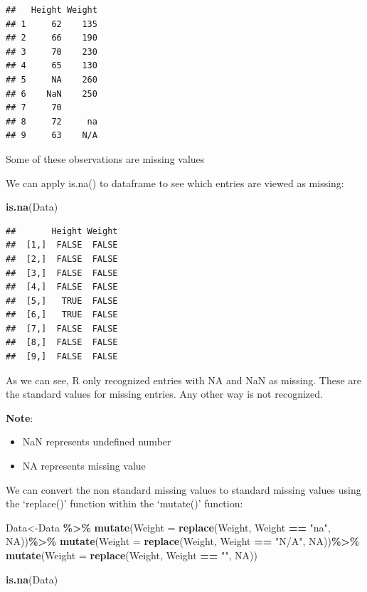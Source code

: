 \documentclass[
  openany]{book}
\newenvironment{Shaded}{\begin{snugshade}}{\end{snugshade}}
\newcommand{\AttributeTok}[1]{\textcolor[rgb]{0.13,0.29,0.53}{#1}}
\newcommand{\ConstantTok}[1]{\textcolor[rgb]{0.56,0.35,0.01}{#1}}
\newcommand{\FunctionTok}[1]{\textcolor[rgb]{0.13,0.29,0.53}{\textbf{#1}}}
\newcommand{\NormalTok}[1]{#1}
\newcommand{\OtherTok}[1]{\textcolor[rgb]{0.56,0.35,0.01}{#1}}
\newcommand{\SpecialCharTok}[1]{\textcolor[rgb]{0.81,0.36,0.00}{\textbf{#1}}}
\newcommand{\StringTok}[1]{\textcolor[rgb]{0.31,0.60,0.02}{#1}}
\providecommand{\tightlist}{%
  \setlength{\itemsep}{0pt}\setlength{\parskip}{0pt}}
\begin{document}
\begin{verbatim}
##   Height Weight
## 1     62    135
## 2     66    190
## 3     70    230
## 4     65    130
## 5     NA    260
## 6    NaN    250
## 7     70       
## 8     72     na
## 9     63    N/A
\end{verbatim}

Some of these observations are missing values

We can apply is.na() to dataframe to see which entries are viewed as missing:

\begin{Shaded}
\begin{Highlighting}[]
\FunctionTok{is.na}\NormalTok{(Data)}
\end{Highlighting}
\end{Shaded}

\begin{verbatim}
##       Height Weight
##  [1,]  FALSE  FALSE
##  [2,]  FALSE  FALSE
##  [3,]  FALSE  FALSE
##  [4,]  FALSE  FALSE
##  [5,]   TRUE  FALSE
##  [6,]   TRUE  FALSE
##  [7,]  FALSE  FALSE
##  [8,]  FALSE  FALSE
##  [9,]  FALSE  FALSE
\end{verbatim}

As we can see, R only recognized entries with NA and NaN as missing. These are the standard values for missing entries. Any other way is not recognized.

\textbf{Note}:

\begin{itemize}
\tightlist
\item
  NaN represents undefined number
\item
  NA represents missing value
\end{itemize}

We can convert the non standard missing values to \textquotesingle standard missing values\textquotesingle{} using the `replace()' function within the `mutate()' function:

\begin{Shaded}
\begin{Highlighting}[]
\NormalTok{Data}\OtherTok{\textless{}{-}}\NormalTok{Data }\SpecialCharTok{\%\textgreater{}\%} 
  \FunctionTok{mutate}\NormalTok{(}\AttributeTok{Weight =} \FunctionTok{replace}\NormalTok{(Weight, Weight }\SpecialCharTok{==} \StringTok{"na"}\NormalTok{, }\ConstantTok{NA}\NormalTok{))}\SpecialCharTok{\%\textgreater{}\%}
  \FunctionTok{mutate}\NormalTok{(}\AttributeTok{Weight =} \FunctionTok{replace}\NormalTok{(Weight, Weight }\SpecialCharTok{==} \StringTok{"N/A"}\NormalTok{, }\ConstantTok{NA}\NormalTok{))}\SpecialCharTok{\%\textgreater{}\%}
  \FunctionTok{mutate}\NormalTok{(}\AttributeTok{Weight =} \FunctionTok{replace}\NormalTok{(Weight, Weight }\SpecialCharTok{==} \StringTok{""}\NormalTok{, }\ConstantTok{NA}\NormalTok{))}

\FunctionTok{is.na}\NormalTok{(Data)}
\end{Highlighting}
\end{Shaded}
\end{document}
